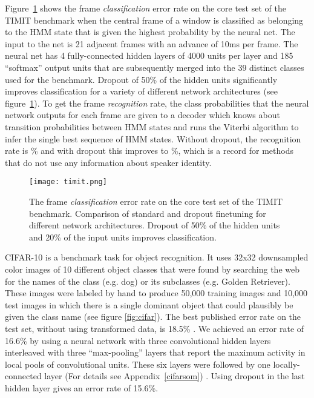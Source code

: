\documentclass[12pt]{article}
\begin{document}
Figure~\ref{fig:timitplot} shows the frame {\it classification} error rate on the core test set of the
TIMIT benchmark when the central frame of a window is classified as belonging to the HMM
state that is given the highest probability by the neural net.  The input to the net is
21 adjacent frames with an advance of 10ms per frame. The neural net has 4 fully-connected
hidden layers of 4000 units per layer and 185 ``softmax'' output units that are subsequently
merged into the 39 distinct classes used for the benchmark. Dropout of 50\% of the hidden
units significantly improves classification for a variety of different network
architectures (see figure~\ref{fig:timitplot}).  To get the frame {\it recognition} rate, the class
probabilities that the neural network outputs for each frame are given to a decoder which
knows about transition probabilities between HMM states and runs the Viterbi algorithm to
infer the single best sequence of HMM states. Without dropout, the recognition rate is
\% and with dropout this improves to \%, which is a record for methods that do not use
any information about speaker identity.

\begin{figure}[t!]
\centerline{\texttt{[image: timit.png]}}
\caption{The frame {\it classification} error rate on the core test set of the TIMIT
  benchmark. Comparison of standard and dropout finetuning for different network
  architectures. Dropout of 50\% of the hidden 
  units and 20\% of the input units improves classification.}
\label{fig:timitplot}
\end{figure}

CIFAR-10 is a benchmark task for object recognition. It uses 32x32 downsampled color
images of 10 different object classes that were found by searching the web for the names
of the class (e.g. dog) or its subclasses (e.g. Golden Retriever). These images were
labeled by hand to produce 50,000 training images and 10,000 test images in which there is
a single dominant object that could plausibly be given the class name \cite{kriz} (see
figure \ref{fig:cifar}). The best published error rate on the test set, without using
transformed data, is 18.5\% \cite{Coates2011}. We achieved an error rate of 16.6\% by using a
neural network with three convolutional hidden layers interleaved with three
``max-pooling'' layers that report the maximum activity in local pools of convolutional
units. These six layers were followed by one locally-connected layer (For details see Appendix~\ref{cifarsom}) . Using
dropout in the last hidden layer gives an error rate of 15.6\%.
\end{document}
